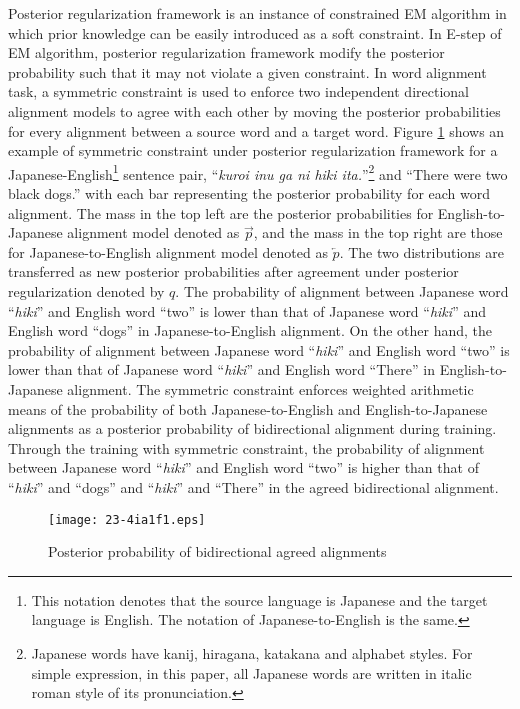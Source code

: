 \documentclass[english]{jnlp_1.4}
\begin{document}
Posterior regularization framework is an instance of constrained EM algorithm in which prior knowledge can be easily introduced as a soft constraint.
In E-step of EM algorithm, posterior regularization framework modify the posterior probability such that it may not violate a given constraint.
In word alignment task, a symmetric constraint is used to enforce two independent directional alignment models to agree with each other by moving the posterior probabilities for every alignment between a source word and a target word.
Figure \ref{fig:exalignment} shows an example of symmetric constraint under posterior regularization framework for a Japanese-English\footnote{This notation denotes that the source language is Japanese and the target language is English. The notation of Japanese-to-English is the same.} sentence pair, ``\textit{kuroi inu ga ni hiki ita.}''\footnote{Japanese words have kanij, hiragana, katakana and alphabet styles. For simple expression, in this paper, all Japanese words are written in italic roman style of its pronunciation.} and ``There were two black dogs.'' with each bar representing the posterior probability for each word alignment.
The mass in the top left are the posterior probabilities for English-to-Japanese alignment model denoted as $\overrightarrow{p}$, and the mass in the top right are those for Japanese-to-English alignment model denoted as $\overleftarrow{p}$.
The two distributions are transferred as new posterior probabilities after agreement under posterior regularization denoted by $q$.
The probability of alignment between Japanese word ``\textit{hiki}'' and English word ``two'' is lower than that of Japanese word ``\textit{hiki}'' and English word ``dogs'' in Japanese-to-English alignment.
On the other hand, the probability of alignment between Japanese word ``\textit{hiki}'' and English word ``two'' is lower than that of Japanese word ``\textit{hiki}'' and English word ``There'' in English-to-Japanese alignment.
The symmetric constraint enforces weighted arithmetic means of the probability of both Japanese-to-English and English-to-Japanese alignments as a posterior probability of bidirectional alignment during training.
Through the training with symmetric constraint, the probability of alignment between Japanese word ``\textit{hiki}'' and English word ``two'' is higher than that of ``\textit{hiki}'' and ``dogs'' and ``\textit{hiki}'' and ``There''  in the agreed bidirectional alignment.

\begin{figure}[t]
\begin{center}
\texttt{[image: 23-4ia1f1.eps]}
\end{center}
\caption{Posterior probability of bidirectional agreed alignments}
\label{fig:exalignment}
\end{figure}
\end{document}
